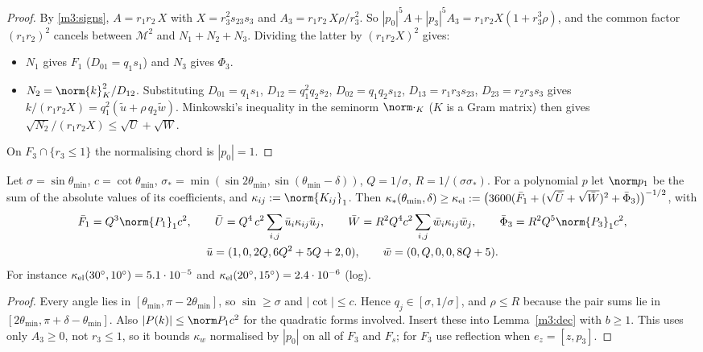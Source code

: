 \begin{proof}
By \eqref{m3:signs}, $A=r_1r_2\,X$ with $X=r_3^2s_{23}s_3$ and $A_3=r_1r_2\,X\rho/r_3^2$. So $|p_0|^5A+|p_3|^5A_3=r_1r_2X(1+r_3^3\rho)$, and the common factor $(r_1r_2)^2$ cancels between $\mathcal M^2$ and $N_1+N_2+N_3$. Dividing the latter by $(r_1r_2X)^2$ gives:
\begin{itemize}
\item $N_1$ gives $F_1$ ($D_{01}=q_1s_1$) and $N_3$ gives $\Phi_3$.
\item $N_2=\norm{k}_K^2/D_{12}$. Substituting $D_{01}=q_1s_1$, $D_{12}=q_1^2q_2s_2$, $D_{02}=q_1q_2s_{12}$, $D_{13}=r_1r_3s_{23}$, $D_{23}=r_2r_3s_3$ gives $k/(r_1r_2X)=q_1^2(\tilde u+\rho\,q_2\tilde w)$. Minkowski's inequality in the seminorm $\norm\cdot_K$ ($K$ is a Gram matrix) then gives $\sqrt{N_2}/(r_1r_2X)\le\sqrt U+\sqrt W$.
\end{itemize}
On $F_3\cap\{r_3\le1\}$ the normalising chord is $|p_0|=1$.
\end{proof}

\begin{corollary}\label{m3:el}
Let $\sigma=\sin\theta_{\min}$, $c=\cot\theta_{\min}$, $\sigma_\ast=\min(\sin2\theta_{\min},\sin(\theta_{\min}-\delta))$, $Q=1/\sigma$, $R=1/(\sigma\sigma_\ast)$. For a polynomial $p$ let $\norm p_1$ be the sum of the absolute values of its coefficients, and $\kappa_{ij}:=\norm{K_{ij}}_1$. Then $\kappa_\ast(\theta_{\min},\delta)\ge\kappa_{\rm el}:=\bigl(3600(\bar F_1+(\sqrt{\bar U}+\sqrt{\bar W})^2+\bar\Phi_3)\bigr)^{-1/2}$, with
\begin{gather*}
\bar F_1=Q^3\norm{P_1}_1c^2,\qquad \bar U=Q^4\,c^2\sum_{i,j}\bar u_i\kappa_{ij}\bar u_j,\qquad \bar W=R^2Q^4c^2\sum_{i,j}\bar w_i\kappa_{ij}\bar w_j,\qquad \bar\Phi_3=R^2Q^5\norm{P_3}_1c^2,\\
\bar u=(1,0,2Q,6Q^2+5Q+2,0),\qquad \bar w=(0,Q,0,0,8Q+5).
\end{gather*}
For instance $\kappa_{\rm el}(30^\circ,10^\circ)=5.1\cdot10^{-5}$ and $\kappa_{\rm el}(20^\circ,15^\circ)=2.4\cdot10^{-6}$ (log).
\end{corollary}

\begin{proof}
Every angle lies in $[\theta_{\min},\pi-2\theta_{\min}]$, so $\sin\ge\sigma$ and $|\cot|\le c$. Hence $q_j\in[\sigma,1/\sigma]$, and $\rho\le R$ because the pair sums lie in $[2\theta_{\min},\pi+\delta-\theta_{\min}]$. Also $|P(k)|\le\norm P_1c^2$ for the quadratic forms involved. Insert these into Lemma~\ref{m3:dec} with $b\ge1$. This uses only $A_3\ge0$, not $r_3\le1$, so it bounds $\kappa_w$ normalised by $|p_0|$ on all of $F_3$ and $F_s$; for $F_3$ use reflection when $e_z=[z,p_3]$.
\end{proof}

